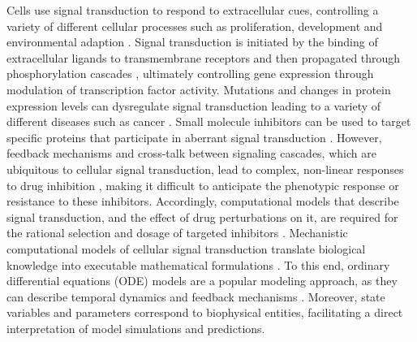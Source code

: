 \documentclass[11pt]{article}
\begin{document}
    Cells use signal transduction to respond to extracellular cues,
controlling a variety of different cellular processes such as
proliferation, development and environmental adaption
\cite{2754712/YK9CS8BY}. Signal transduction is initiated by the binding
of extracellular ligands to transmembrane receptors
\cite{2754712/QR4JIKLV} and then propagated through phosphorylation
cascades \cite{2754712/B6ZP8LH6} \cite{2754712/NPR437GQ}, ultimately
controlling gene expression through modulation of transcription factor
activity. Mutations and changes in protein expression levels can
dysregulate signal transduction leading to a variety of different
diseases such as cancer \cite{2754712/L8NRTXRQ}. Small molecule
inhibitors can be used to target specific proteins that participate in
aberrant signal transduction \cite{2754712/7ZXBI6XG}. However, feedback
mechanisms and cross-talk between signaling cascades, which are
ubiquitous to cellular signal transduction, lead to complex, non-linear
responses to drug inhibition \cite{2754712/URVR5RD5}, making it
difficult to anticipate the phenotypic response or resistance to these
inhibitors. Accordingly, computational models that describe signal
transduction, and the effect of drug perturbations on it, are required
for the rational selection and dosage of targeted inhibitors
\cite{2754712/DUK5BLQ4}. Mechanistic computational models of cellular
signal transduction translate biological knowledge into executable
mathematical formulations \cite{2754712/6JVZVNVK}. To this end, ordinary
differential equations (ODE) models are a popular modeling approach, as
they can describe temporal dynamics and feedback mechanisms
\cite{2754712/X784IDZJ}. Moreover, state variables and parameters
correspond to biophysical entities, facilitating a direct interpretation
of model simulations and predictions.
\end{document}
